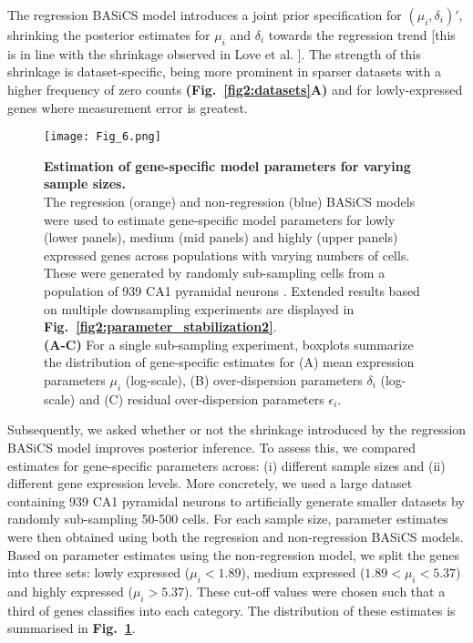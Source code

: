 \newpage

The regression BASiCS model introduces a joint prior specification for $(\mu_i, \delta_i)'$, shrinking the posterior estimates for $\mu_i$ and $\delta_i$ towards the regression trend [this is in line with the shrinkage observed in Love et al. \citep{Love2014}]. The strength of this shrinkage is dataset-specific, being more prominent in sparser datasets with a higher frequency of zero counts \textbf{(Fig.~\ref{fig2:datasets}A)} and for lowly-expressed genes where measurement error is greatest. \\

\begin{figure}[!h]
\centering
\texttt{[image: Fig\_6.png]}
\caption[Estimation of gene-specific model parameters for varying sample sizes]{\textbf{Estimation of gene-specific model parameters for varying sample sizes.}\\
The regression (orange) and non-regression (blue) BASiCS models were used to estimate gene-specific model parameters for lowly (lower panels), medium (mid panels) and highly (upper panels) expressed genes across populations with varying numbers of cells. These were generated by randomly sub-sampling cells from a population of 939 CA1 pyramidal neurons \citep{Zeisel2015}. Extended results based on multiple downsampling experiments are displayed in \textbf{Fig.~\ref{fig2:parameter_stabilization2}}.  \\
\textbf{(A-C)} For a single sub-sampling experiment, boxplots summarize the distribution of gene-specific estimates for (A) mean expression parameters $\mu_i$ (log-scale), (B) over-dispersion parameters $\delta_i$ (log-scale) and (C) residual over-dispersion parameters $\epsilon_i$.}
\label{fig2:parameter_stabilization}
\end{figure}

Subsequently, we asked whether or not the shrinkage introduced by the regression BASiCS model improves posterior inference. To assess this, we compared estimates for gene-specific parameters across: (i) different sample sizes and (ii) different gene expression levels. More concretely, we used a large dataset containing 939 CA1 pyramidal neurons \citep{Zeisel2015} to artificially generate smaller datasets by randomly sub-sampling 50-500 cells. For each sample size, parameter estimates were then obtained using both the regression and non-regression BASiCS models. 
Based on parameter estimates using the non-regression model, we split the genes into three sets: lowly expressed ($\mu_i<1.89$), medium expressed ($1.89<\mu_i<5.37$) and highly expressed ($\mu_i>5.37$). These cut-off values were chosen such that a third of genes classifies into each category. The distribution of these estimates is summarised in \textbf{Fig.~\ref{fig2:parameter_stabilization}}. \\

